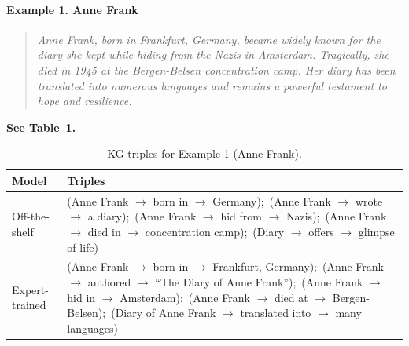 \documentclass[11pt]{article}
\begin{document}
{\paragraph{Example 1. Anne Frank}
\begin{quote}\small
\textit{Anne Frank, born in Frankfurt, Germany, became widely known for the diary she kept
while hiding from the Nazis in Amsterdam. Tragically, she died in 1945 at the
Bergen-Belsen concentration camp. Her diary has been translated into numerous languages and
remains a powerful testament to hope and resilience.}
\end{quote}
\noindent\textbf{See Table~\ref{tab:anne}.}
\begin{table}[h]
\centering\small
\caption{KG triples for Example 1 (Anne Frank).}\label{tab:anne}
\begin{tabular}{@{}p{}p{}@{}}
\textbf{Model} & \textbf{Triples}\\\hline
Off-the-shelf &
\ttfamily(Anne Frank $\to$ born in $\to$ Germany);\,
(Anne Frank $\to$ wrote $\to$ a diary);\,
(Anne Frank $\to$ hid from $\to$ Nazis);\,
(Anne Frank $\to$ died in $\to$ concentration camp);\,
(Diary $\to$ offers $\to$ glimpse of life)
\\
Expert-trained &
\ttfamily(Anne Frank $\to$ born in $\to$ Frankfurt, Germany);\,
(Anne Frank $\to$ authored $\to$ “The Diary of Anne Frank”);\,
(Anne Frank $\to$ hid in $\to$ Amsterdam);\,
(Anne Frank $\to$ died at $\to$ Bergen-Belsen);\,
(Diary of Anne Frank $\to$ translated into $\to$ many languages)
\end{tabular}
\end{table}

}
\end{document}
